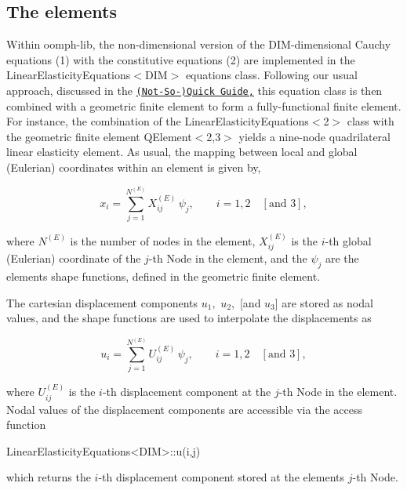 \hypertarget{index_el}{}\subsection{The elements}\label{index_el}
Within {\ttfamily oomph-\/lib}, the non-\/dimensional version of the {\ttfamily D\+IM}-\/dimensional Cauchy equations (1) with the constitutive equations (2) are implemented in the {\ttfamily Linear\+Elasticity\+Equations$<$\+D\+I\+M$>$} equations class. Following our usual approach, discussed in the \href{../../../quick_guide/html/index.html}{\tt (Not-\/\+So-\/)Quick Guide,} this equation class is then combined with a geometric finite element to form a fully-\/functional finite element. For instance, the combination of the {\ttfamily Linear\+Elasticity\+Equations$<$2$>$} class with the geometric finite element {\ttfamily Q\+Element$<$2,3$>$} yields a nine-\/node quadrilateral linear elasticity element. As usual, the mapping between local and global (Eulerian) coordinates within an element is given by, \begin{center} \[ x_i = \sum_{j=1}^{N^{(E)}} X^{(E)}_{ij} \, \psi_j, \qquad i=1,2\quad [\mbox{and }3], \] \end{center}  where $ N^{(E)} $ is the number of nodes in the element, $ X^{(E)}_{ij} $ is the $ i $-\/th global (Eulerian) coordinate of the $ j $-\/th {\ttfamily Node} in the element, and the $ \psi_j $ are the element\textquotesingle{}s shape functions, defined in the geometric finite element.

The cartesian displacement components $ u_1, $ $ u_2, $ \mbox{[}and $ u_3 $\mbox{]} are stored as nodal values, and the shape functions are used to interpolate the displacements as \begin{center} \[ u_i = \sum_{j=1}^{N^{(E)}} U^{(E)}_{ij} \, \psi_j, \qquad i=1,2\quad [\mbox{and }3], \] \end{center}  where $ U^{(E)}_{ij} $ is the $ i $-\/th displacement component at the $ j $-\/th {\ttfamily Node} in the element. Nodal values of the displacement components are accessible via the access function


\begin{DoxyCode}
LinearElasticityEquations<DIM>::u(i,j)
\end{DoxyCode}


which returns the $ i $-\/th displacement component stored at the element\textquotesingle{}s $ j $-\/th {\ttfamily Node}.



 

